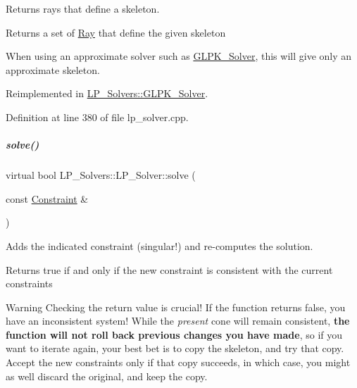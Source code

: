 Returns rays that define a skeleton. 

\begin{DoxyReturn}{Returns}
a set of \hyperlink{group___c_l_s_solvers_class_l_p___solvers_1_1_ray}{Ray} that define the given skeleton
\end{DoxyReturn}
When using an approximate solver such as \hyperlink{group___c_l_s_solvers_class_l_p___solvers_1_1_g_l_p_k___solver}{G\+L\+P\+K\+\_\+\+Solver}, this will give only an approximate skeleton. 

Reimplemented in \hyperlink{group___c_l_s_solvers_a9ded7ec7a82decb93132e10e25851528}{L\+P\+\_\+\+Solvers\+::\+G\+L\+P\+K\+\_\+\+Solver}.



Definition at line 380 of file lp\+\_\+solver.\+cpp.

\mbox{\label{group___c_l_s_solvers_a8b9979fb228ac9ccfe037ad6ca48b314}} 
\subparagraph{\texorpdfstring{solve()}{solve()}\hspace{0.1cm}{\footnotesize\ttfamily [1/2]}}
{\footnotesize\ttfamily virtual bool L\+P\+\_\+\+Solvers\+::\+L\+P\+\_\+\+Solver\+::solve (\begin{DoxyParamCaption}\item[{const \hyperlink{group___c_l_s_solvers_class_l_p___solvers_1_1_constraint}{Constraint} \&}]{ }\end{DoxyParamCaption})\hspace{0.3cm}{\ttfamily [pure virtual]}}



Adds the indicated constraint (singular!) and re-\/computes the solution. 

\begin{DoxyReturn}{Returns}
{\ttfamily true} if and only if the new constraint is consistent with the current constraints
\end{DoxyReturn}
\begin{DoxyWarning}{Warning}
Checking the return value is crucial! If the function returns {\ttfamily false}, you have an inconsistent system! While the {\itshape present} cone will remain consistent, {\bfseries the function will not roll back previous changes you have made}, so if you want to iterate again, your best bet is to copy the skeleton, and try that copy. Accept the new constraints only if that copy succeeds, in which case, you might as well discard the original, and keep the copy. 
\end{DoxyWarning}


